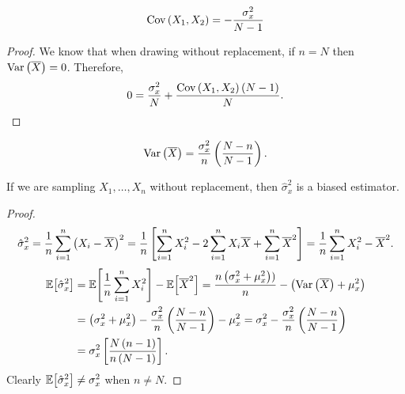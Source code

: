 \begin{cor}
    \begin{align*}
        \operatorname{Cov}\left(X_1, X_2\right) = -\frac{\sigma_x^2}{N-1}
    \end{align*}
\end{cor}

\begin{proof}
    We know that when drawing without replacement, if $n = N$ then $\operatorname{Var}\left(\overline{X}\right) = 0$. Therefore,
    \begin{align*}
        0 = \frac{\sigma_x^2}{N} + \frac{\operatorname{Cov}\left(X_1, X_2\right)\left(N-1\right)}{N}.
    \end{align*}
\end{proof}

\begin{cor}
    \begin{align*}
        \operatorname{Var}\left(\overline{X}\right) = \frac{\sigma_x^2}{n}\left(\frac{N-n}{N-1}\right).
    \end{align*}
\end{cor}

\begin{prop}
    If we are sampling $X_1, \ldots, X_n$ without replacement, then $\hat{\sigma}_x^2$ is a biased estimator.
\end{prop}

\begin{proof}
    \begin{align*}
        \hat{\sigma}_x^2 = \frac{1}{n}\sum_{i=1}^{n}\left(X_i - \overline{X}\right)^{2} = \frac{1}{n}\left[\sum_{i=1}^{n}X_i^2 - 2\sum_{i=1}^{n}X_i\overline{X} + \sum_{i=1}^{n}\overline{X}^{2}\right] = \frac{1}{n}\sum_{i=1}^{n}X_i^2 - \overline{X}^2.
    \end{align*}
    \begin{align*}
        \operatorname{\mathbb{E}}\!\left[{\hat{\sigma}_x^2}\right] &= \operatorname{\mathbb{E}}\!\left[{\frac{1}{n}\sum_{i=1}^{n}X_i^2}\right] - \operatorname{\mathbb{E}}\!\left[{\overline{X}^2}\right] = \frac{n\left(\sigma_x^2 + \mu_x^2\right))}{n} - \left(\operatorname{Var}\left(\overline{X}\right) + \mu_x^2\right) \\
        &= \left(\sigma_x^2 + \mu_x^2\right) - \frac{\sigma_x^2}{n}\left(\frac{N-n}{N-1}\right) - \mu_x^2 = \sigma_x^2 - \frac{\sigma_x^2}{n}\left(\frac{N-n}{N-1}\right) \\
        &= \sigma_x^2\left[\frac{N\left(n-1\right)}{n\left(N-1\right)}\right].
    \end{align*}
    Clearly $\operatorname{\mathbb{E}}\!\left[{\hat{\sigma}_x^2}\right] \neq \sigma_x^2$ when $n \neq N$.
\end{proof}

